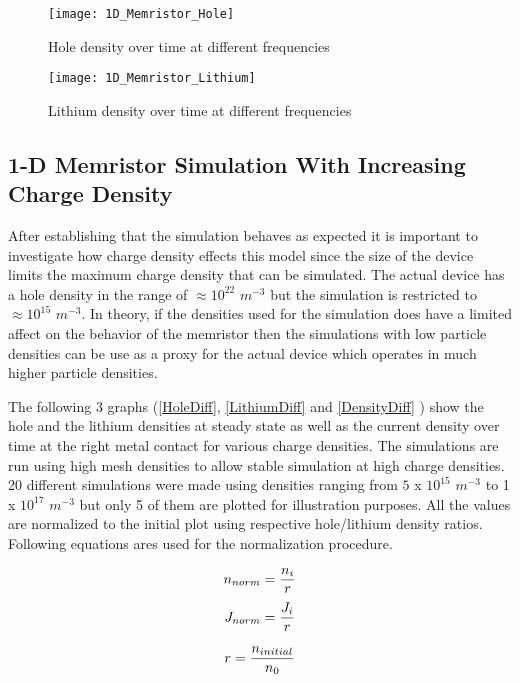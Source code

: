 \begin{doublespace}
\begin{figure}[!htp]
\centering
\texttt{[image: 1D\_Memristor\_Hole]}
\caption{Hole density over time at different frequencies} 
\label{Bowhole}
\end{figure}

\begin{figure}[!htp]
\centering
\texttt{[image: 1D\_Memristor\_Lithium]}
\caption{Lithium density over time at different frequencies} 
\label{Bowli}
\end{figure}


\clearpage
\subsection{1-D Memristor Simulation With Increasing Charge Density}

After establishing that the simulation behaves as expected it is important to investigate how charge density effects this model since the size of the device limits the maximum charge density that can be simulated. The actual device has a hole density in the range of $ \approx 10^{22}$ $m^{-3}$ but the simulation is restricted to $\approx 10^{15}$ $m^{-3}$. In theory, if the densities used for the simulation does have a limited affect on the behavior of the memristor then the simulations with low particle densities can be use as a proxy for the actual device which operates in much higher particle densities.

 The following 3 graphs (\ref{HoleDiff}, \ref{LithiumDiff} and \ref{DensityDiff} ) show the hole and the lithium densities at steady state as well as the current density over time at the right metal contact for various charge densities. The simulations are run using high mesh densities to allow stable simulation at high charge densities. 20 different simulations were made using densities ranging from $5$ x $10^{15}$  $m^{-3}$ to 1 x $10^{17}$  $m^{-3}$ but only 5 of them are plotted for illustration purposes. All the values are normalized to the initial plot using respective hole/lithium density ratios. Following equations ares used for the normalization procedure.


\begin{equation}
\centering
n_{norm}= \frac{n_i}{r} 
\end{equation}
\begin{equation}
\centering
J_{norm}= \frac{J_i}{r} 
\end{equation}

\begin{equation}
\centering
r = \frac{n_{initial}}{n_{0}}
\label{NormConst}
\end{equation}


\end{doublespace}

